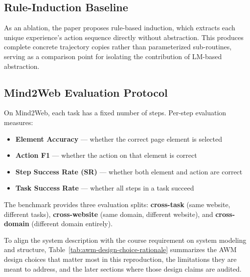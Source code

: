 \documentclass{article}
\providecommand{\tightlist}{%
  \setlength{\itemsep}{0pt}\setlength{\parskip}{0.8em}}
\begin{document}
\subsection{Rule-Induction
Baseline}\label{rule-induction-baseline}

As an ablation, the paper proposes rule-based induction, which extracts
each unique experience's action sequence directly without abstraction.
This produces complete concrete trajectory copies rather than
parameterized sub-routines, serving as a comparison point for isolating
the contribution of LM-based abstraction.

\subsection{Mind2Web Evaluation
Protocol}\label{mind2web-evaluation-protocol}

On Mind2Web, each task has a fixed number of steps. Per-step evaluation
measures:

\begin{itemize}
\tightlist
\item
  \textbf{Element Accuracy} --- whether the correct page element is
  selected
\item
  \textbf{Action F1} --- whether the action on that element is correct
\item
  \textbf{Step Success Rate (SR)} --- whether both element and action
  are correct
\item
  \textbf{Task Success Rate} --- whether all steps in a task succeed
\end{itemize}

The benchmark provides three evaluation splits: \textbf{cross-task}
(same website, different tasks), \textbf{cross-website} (same domain,
different website), and \textbf{cross-domain} (different domain
entirely).

To align the system description with the course requirement on system
modeling and structure, Table~\ref{tab:awm-design-choice-rationale}
summarizes the AWM design choices that matter most in this reproduction,
the limitations they are meant to address, and the later sections where
those design claims are audited.
\end{document}
